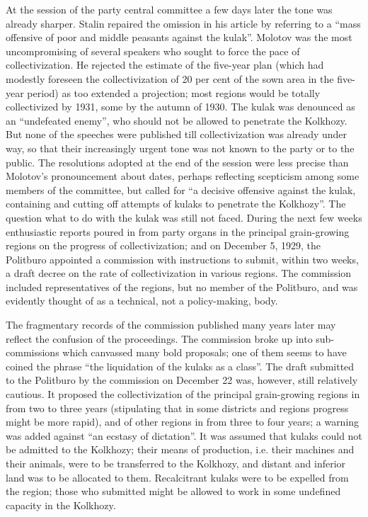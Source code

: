 At the session of the party central committee a few days later the tone was already sharper. Stalin repaired the omission in his article by referring to a ``mass offensive of poor and middle peasants against the kulak''. Molotov was the most uncompromising of several speakers who sought to force the pace of collectivization. He rejected the estimate of the five-year plan (which had modestly foreseen the collectivization of 20 per cent of the sown area in the five-year period) as too extended a projection; most regions would be totally collectivized by 1931, some by the autumn of 1930. The kulak was denounced as an ``undefeated enemy'', who should not be allowed to penetrate the Kolkhozy. But none of the speeches were published till collectivization was already under way, so that their increasingly urgent tone was not known to the party or to the public. The resolutions adopted at the end of the session were less precise than Molotov's pronouncement about dates, perhaps reflecting scepticism among some members of the committee, but called for ``a decisive offensive against the kulak, containing and cutting off attempts of kulaks to penetrate the Kolkhozy''. The question what to do with the kulak was still not faced. During the next few weeks enthusiastic reports poured in from party organs in the principal grain-growing regions on the progress of collectivization; and on December 5, 1929, the Politburo appointed a commission with instructions to submit, within two weeks, a draft decree on the rate of collectivization in various regions. The commission included representatives of the regions, but no member of the Politburo, and was evidently thought of as a technical, not a policy-making, body. 

The fragmentary records of the commission published many years later may reflect the confusion of the proceedings. The commission broke up into sub-commissions which canvassed many bold proposals; one of them seems to have coined the phrase ``the liquidation of the kulaks as a class''. The draft submitted to the Politburo by the commission on December 22 was, however, still relatively cautious. It proposed the collectivization of the principal grain-growing regions in from two to three years (stipulating that in some districts and regions progress might be more rapid), and of other regions in from three to four years; a warning was added against ``an ecstasy of dictation''. It was assumed that kulaks could not be admitted to the Kolkhozy; their means of production, i.e. their machines and their animals, were to be transferred to the Kolkhozy, and distant and inferior land was to be allocated to them. Recalcitrant kulaks were to be expelled from the region; those who submitted might be allowed to work in some undefined capacity in the Kolkhozy. 

